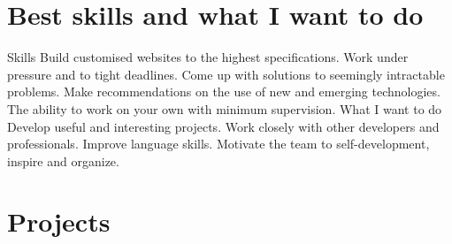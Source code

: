 \documentclass[11pt,a4paper]{moderncv}
\begin{document}
\maketitle
\section{Best skills and what I want to do}
  \cvline
    {Skills}{
      Build customised websites to the highest specifications.
      Work under pressure and to tight deadlines.
      Come up with solutions to seemingly intractable problems.
      Make recommendations on the use of new and emerging technologies.
      The ability to work on your own with minimum supervision.}
  \cvline
    {What I want to do}{
      Develop useful and interesting projects.
      Work closely with other developers and professionals.
      Improve language skills.
      Motivate the team to self-development, inspire and organize.}

\section{Projects}
\end{document}
